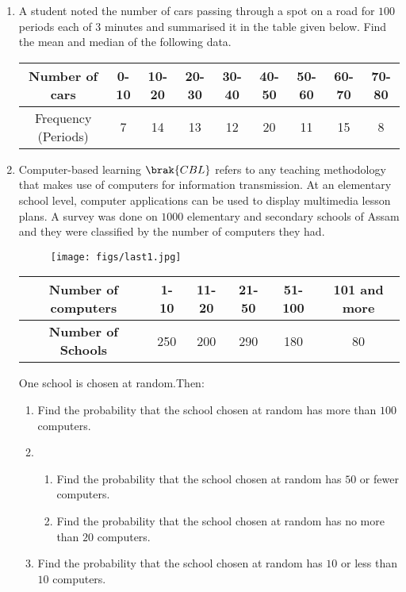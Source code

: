 \begin{enumerate}
\item A student noted the number of cars passing through a spot on a road for $100$ periods each of $3$ minutes and summarised it in the table given below. Find the mean and median of the following data.\\

	\begin{tabular}{|c|c|c|c|c|c|c|c|c|}
\hline
Number of cars & 0-10 & 10-20 & 20-30 & 30-40 & 40-50 & 50-60 & 60-70 & 70-80\\ 
\hline
Frequency (Periods) & 7 & 14 & 13 & 12 & 20 & 11 & 15 & 8\\ 
\hline

\end{tabular}

\item Computer-based learning $\brak{CBL}$ refers to any teaching methodology that makes use of computers for information transmission. At an elementary school level, computer applications can be used to display multimedia lesson plans. A survey was done on $1000$ elementary and secondary schools of Assam and they were classified by the number of computers they had.

	\begin{figure}[!ht]
		\centering
		\texttt{[image: figs/last1.jpg]}
		\caption{}
		\label{fig:enter-label}
	\end{figure}

	\begin{center}
	\begin{tabular}{|c|c|c|c|c|c|}
	\hline
	\textbf{Number of computers} & 1-10 & 11-20 & 21-50 &  51-100 & 101 and more \\
	\hline
	\textbf{Number of Schools} & 250 & 200 & 290 & 180 & 80 \\
	\hline
	\end{tabular}
	\end{center}

	\text One school is chosen at random.Then:
	\begin{enumerate}
		\item  Find the probability that the school chosen at random has more than $100$ computers.
		\item
		\begin{enumerate}
			\item  Find the probability that the school chosen at random has $50$ or fewer computers.
			\item  Find the probability that the school chosen at random has no more than $20$ computers.
		\end{enumerate}
		\item  Find the probability that the school chosen at random has $10$ or less than $10$ computers.
	\end{enumerate}


\end{enumerate}
